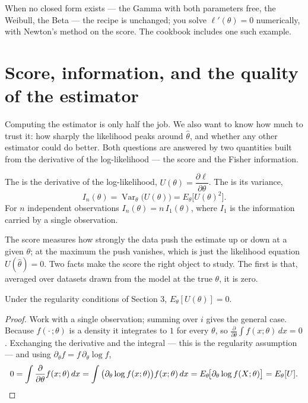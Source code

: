 \documentclass[11pt]{article}
\begin{document}
\noindent When no closed form exists --- the Gamma with both parameters free,
the Weibull, the Beta --- the recipe is unchanged; you solve
$\ell'(\theta)=0$ numerically, with Newton's method on the score. The cookbook
includes one such example.

\section{Score, information, and the quality of the estimator}

Computing the estimator is only half the job. We also want to know how much
to trust it: how sharply the likelihood peaks around $\hat\theta$, and
whether any other estimator could do better. Both questions are answered by
two quantities built from the derivative of the log-likelihood --- the
score and the Fisher information.

\begin{definition}
The  is the derivative of the log-likelihood,
$U(\theta)=\dfrac{\partial \ell}{\partial\theta}$. The  is its variance,
\[
  I_n(\theta) = \operatorname{Var}_\theta\!\big(U(\theta)\big)
              = E_\theta\!\big[U(\theta)^2\big].
\]
For $n$ independent observations $I_n(\theta)=n\,I_1(\theta)$, where $I_1$
is the information carried by a single observation.
\end{definition}

The score measures how strongly the data push the estimate up or down at a
given $\theta$; at the maximum the push vanishes, which is just the
likelihood equation $U(\hat\theta)=0$. Two facts make the score the right
object to study. The first is that, averaged over datasets drawn from the
model at the true $\theta$, it is zero.

\begin{theorem}
Under the regularity conditions of Section 3, $E_\theta[U(\theta)] = 0$.
\end{theorem}
\begin{proof}
Work with a single observation; summing over $i$ gives the general case.
Because $f(\cdot\,;\theta)$ is a density it integrates to $1$ for every
$\theta$, so $\frac{\partial}{\partial\theta}\int f(x;\theta)\,dx = 0$.
Exchanging the derivative and the integral --- this is the regularity
assumption --- and using $\partial_\theta f = f\,\partial_\theta\log f$,
\[
  0 = \int \frac{\partial}{\partial\theta} f(x;\theta)\,dx
    = \int \big(\partial_\theta \log f(x;\theta)\big) f(x;\theta)\,dx
    = E_\theta\!\big[\partial_\theta \log f(X;\theta)\big] = E_\theta[U]. \qedhere
\]
\end{proof}
\end{document}
